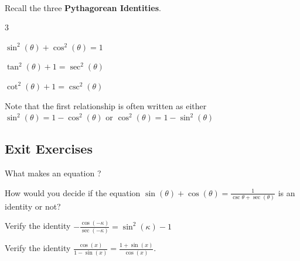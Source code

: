 \begin{myDefinition}~\\[0.5mm]
	Recall the three \textbf{Pythagorean Identities}.
	\begin{itemize}
	\end{itemize}
	Note that the first relationship is often written as either $\sin^2(\theta)=1-\cos^2(\theta)$ or $\cos^2(\theta)=1-\sin^2(\theta)$
\end{myDefinition}

\newpage

\subsection*{Exit Exercises} \label{exit-exercises-section-trig-identities}

\begin{myExit}
	What makes an equation ?
	\vfill
\end{myExit}

\begin{myExit}
	How would you decide if the equation $\sin(\theta)+\cos(\theta)=\frac{1}{\csc{\theta}+\sec(\theta)}$ is an identity or not? 
	\vfill
\end{myExit}

\begin{myExit}
	Verify the identity $-\frac{\cos(-\kappa)}{\sec(-\kappa)}=\sin^2(\kappa)-1$
	\vfill
	\vfill
	\vfill
\end{myExit}

\begin{myExit}
	Verify the identity $\frac{\cos(x)}{1-\sin(x)}=\frac{1+\sin(x)}{\cos(x)}$.
	\vfill
	\vfill
	\vfill
\end{myExit}

